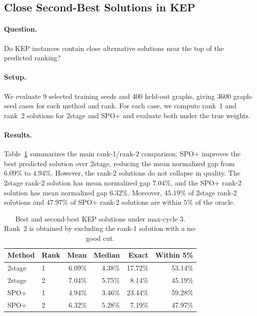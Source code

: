 \subsection{Close Second-Best Solutions in KEP}

\paragraph{Question.}
Do KEP instances contain close alternative solutions near the top of the
predicted ranking?

\paragraph{Setup.}
We evaluate 9 selected training seeds and 400 held-out graphs, giving 3600
graph-seed cases for each method and rank. For each case, we compute rank~1 and
rank~2 solutions for 2stage and SPO+ and evaluate both under the true weights.

\paragraph{Results.}
Table~\ref{tab:second-best-summary} summarizes the main rank-1/rank-2
comparison. SPO+ improves the best predicted solution over 2stage, reducing the
mean normalized gap from $6.09\%$ to $4.94\%$. However, the rank-2 solutions do
not collapse in quality. The 2stage rank-2 solution has mean normalized gap
$7.04\%$, and the SPO+ rank-2 solution has mean normalized gap $6.32\%$.
Moreover, $45.19\%$ of 2stage rank-2 solutions and $47.97\%$ of SPO+ rank-2
solutions are within $5\%$ of the oracle.

\begin{table}[t]
\centering
\small
\setlength{\tabcolsep}{4pt}
\begin{tabular}{@{}llrrrr@{}}
\toprule
Method & Rank & Mean & Median & Exact & Within 5\% \\
\midrule
2stage & 1 & 6.09\% & 4.38\% & 17.72\% & 53.14\% \\
2stage & 2 & 7.04\% & 5.75\% & 8.14\% & 45.19\% \\
SPO+ & 1 & 4.94\% & 3.46\% & 23.44\% & 59.28\% \\
SPO+ & 2 & 6.32\% & 5.28\% & 7.19\% & 47.97\% \\
\bottomrule
\end{tabular}
\caption{Best and second-best KEP solutions under max-cycle 3. Rank~2 is
obtained by excluding the rank-1 solution with a no-good cut.}
\label{tab:second-best-summary}
\end{table}


